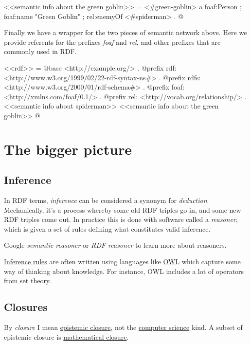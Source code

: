 \documentclass{article}
\begin{document}
<<semantic info about the green goblin>> =
<#green-goblin>
    a foaf:Person ;
    foaf:name "Green Goblin" ;
    rel:enemyOf <#spiderman> .
@

Finally we have a wrapper for the two pieces of semantic network above. Here we
provide referents for the prefixes \textit{foaf} and \textit{rel}, and other prefixes
that are commonly used in RDF.

<<rdf>> =
@base <http://example.org/> .
@prefix rdf: <http://www.w3.org/1999/02/22-rdf-syntax-ns#> .
@prefix rdfs: <http://www.w3.org/2000/01/rdf-schema#> .
@prefix foaf: <http://xmlns.com/foaf/0.1/> .
@prefix rel: <http://vocab.org/relationship/> .
<<semantic info about spiderman>>
<<semantic info about the green goblin>>
@

\section{The bigger picture}

\subsection{Inference}

In RDF terms, \textit{inference} can be considered a synonym for \textit{deduction}.
Mechanically, it's a process whereby some old RDF triples go in, and some new RDF triples
come out. In practice this is done with software called a \textit{reasoner}, which is
given a set of rules defining what constitutes valid inference.

Google \textit{semantic reasoner} or \textit{RDF reasoner} to learn more about reasoners.

\href{https://en.wikipedia.org/wiki/Rule_of_inference}{Inference rules} are often written
using languages like
\href{https://www.w3.org/2001/sw/wiki/OWL}{OWL} which capture some way of thinking
about knowledge. For instance, OWL includes a lot of operators from set theory.

\subsection{Closures}

By \textit{closure} I mean
\href{https://en.wikipedia.org/wiki/Epistemic_closure}{epistemic closure},
not the
\href{https://en.wikipedia.org/wiki/Closure_(computer_programming)}{computer science}
kind. A subset of epistemic closure is
\href{https://en.wikipedia.org/wiki/Closure_(mathematics)}{mathematical closure}.
\end{document}
